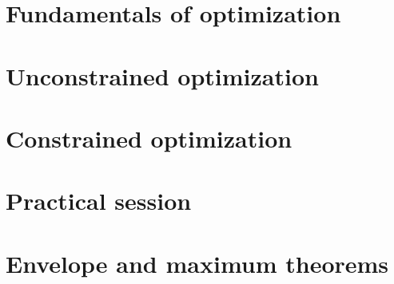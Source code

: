 \documentclass[letterpaper,10pt,english]{jupyterBook}
\begin{document}
\sphinxstepscope


\chapter{Fundamentals of optimization}
\label{\detokenize{06.optimization_fundamentals:fundamentals-of-optimization}}\label{\detokenize{06.optimization_fundamentals::doc}}

\sphinxstepscope


\chapter{Unconstrained optimization}
\label{\detokenize{07.unconstrained:unconstrained-optimization}}\label{\detokenize{07.unconstrained::doc}}

\sphinxstepscope


\chapter{Constrained optimization}
\label{\detokenize{08.constrained:constrained-optimization}}\label{\detokenize{08.constrained::doc}}

\sphinxstepscope


\chapter{Practical session}
\label{\detokenize{09.practical_session:practical-session}}\label{\detokenize{09.practical_session::doc}}

\sphinxstepscope


\chapter{Envelope and maximum theorems}
\label{\detokenize{10.envelope_maximum:envelope-and-maximum-theorems}}\label{\detokenize{10.envelope_maximum::doc}}
\end{document}
